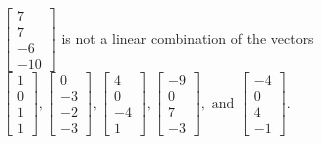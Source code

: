 \begin{exercise}
\begin{exerciseStatement}
  \end{exerciseStatement}
  \begin{exerciseAnswer}
   \(\left[\begin{array}{c}
7 \\
7 \\
-6 \\
-10
\end{array}\right]\) 
  	 is not  
	a linear combination of the vectors \(\left[\begin{array}{c}
1 \\
0 \\
1 \\
1
\end{array}\right] , \left[\begin{array}{c}
0 \\
-3 \\
-2 \\
-3
\end{array}\right] , \left[\begin{array}{c}
4 \\
0 \\
-4 \\
1
\end{array}\right] , \left[\begin{array}{c}
-9 \\
0 \\
7 \\
-3
\end{array}\right] , \text{ and } \left[\begin{array}{c}
-4 \\
0 \\
4 \\
-1
\end{array}\right]\).

	
  


  \end{exerciseAnswer}
\end{exercise}